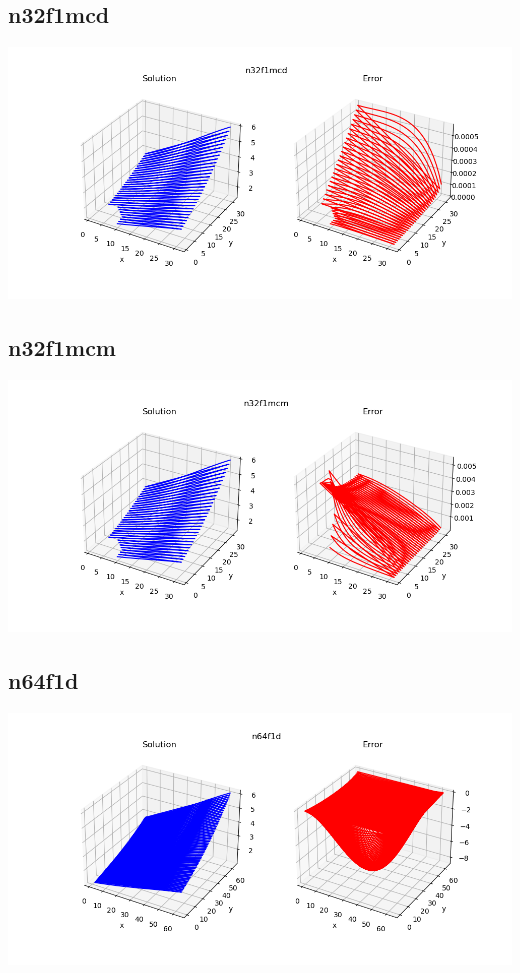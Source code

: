 \subsection*{n32f1mcd}
\includegraphics[scale=0.6]{../../image/n32f1mcd.png}
\subsection*{n32f1mcm}
\includegraphics[scale=0.6]{../../image/n32f1mcm.png}
\subsection*{n64f1d}
\includegraphics[scale=0.6]{../../image/n64f1d.png}

